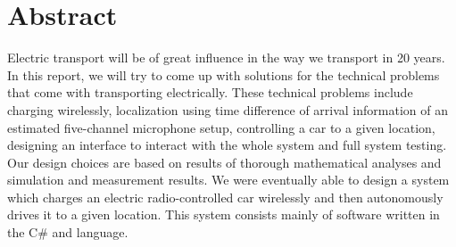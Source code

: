 \documentclass[11pt,titlepage]{report}
\begin{document}
\section*{Abstract}
Electric transport will be of great influence in the way we transport in 20 years. In this report, we will try to come up with solutions for the technical problems that come with transporting electrically. These technical problems include charging wirelessly, localization using time difference of arrival information of an estimated five-channel microphone setup, controlling a car to a given location, designing an interface to interact with the whole system and full system testing. Our design choices are based on results of thorough mathematical analyses and simulation and measurement results. We were eventually able to design a system which charges an electric radio-controlled car wirelessly and then autonomously drives it to a given location. This system consists mainly of software written in the C\# and  language.
\end{document}
